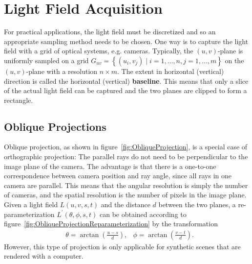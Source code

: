 \section{Light Field Acquisition}

For practical applications, the light field must be discretized and so an appropriate sampling method needs to be chosen.
One way is to capture the light field with a grid of optical systems, e.g. cameras.
Typically, the $(u, v)$-plane is uniformly sampled on a grid $G_{uv} = \left \{ \left( u_i, v_j \right) \mid i = 1,\dots, n, j = 1, \dots, m\right \}$ on the $(u, v)$-plane with a resolution $n \times m$.
The extent in horizontal (vertical) direction is called the horizontal (vertical) \textbf{baseline}.
This means that only a slice of the actual light field can be captured and the two planes are clipped to form a rectangle.



\subsection*{Oblique Projections}

Oblique projection, as shown in figure~\ref{fig:ObliqueProjection}, is a special case of orthographic projection: The parallel rays do not need to be perpendicular to the image plane of the camera.
The advantage is that there is a one-to-one correspondence between camera position and ray angle, since all rays in one camera are parallel.
This means that the angular resolution is simply the number of cameras, and the spatial resolution is the number of pixels in the image plane.
Given a light field $L(u, v, s, t)$ and the distance $d$ between the two planes, a re-parameterization $L^{\prime}(\theta, \phi, s, t)$ can be obtained according to figure~\ref{fig:ObliqueProjectionReparameterization} by the transformation
\begin{align*}
		& \theta = \arctan\left(\frac{u - s}{d}\right), & \phi = \arctan\left(\frac{v - t}{d}\right).
\end{align*}
However, this type of projection is only applicable for synthetic scenes that are rendered with a computer.


